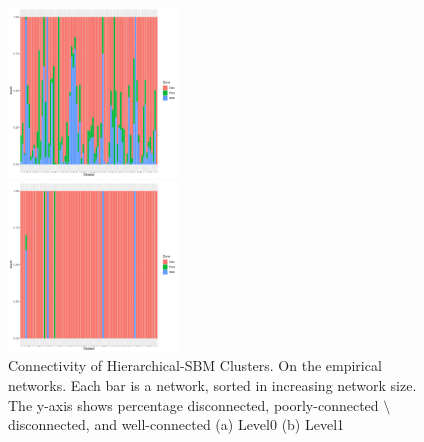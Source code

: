 \documentclass[aps,pre,superscriptaddress]{revtex4}
\begin{document}
\begin{figure}[ht]
	\centering
	\begin{subfloat}
		\centering
		\includegraphics[width=0.4\textwidth]{fig3a.pdf}
	\end{subfloat}
	\begin{subfloat}
		\centering
		\includegraphics[width=0.4\textwidth]{fig3b.pdf}
	\end{subfloat}
	\caption{Connectivity of Hierarchical-SBM Clusters.
		On the empirical networks.
		Each bar is a network, sorted in increasing network size.
		The y-axis shows percentage disconnected, poorly-connected $\setminus$ disconnected, and well-connected
		(a) Level0 (b) Level1}
	\label{figs:fig2}
\end{figure}
\end{document}
